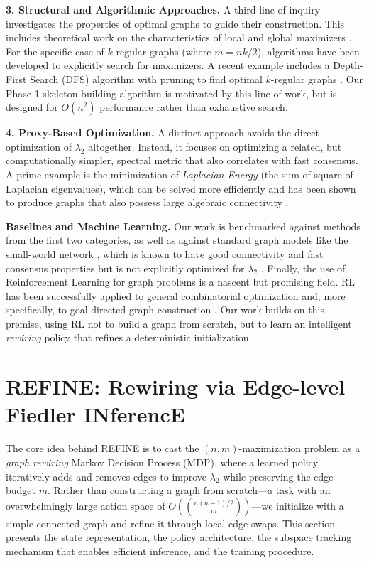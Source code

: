 \documentclass{article}
\begin{document}
\textbf{3. Structural and Algorithmic Approaches.} A third line of inquiry investigates the properties of optimal graphs to guide their construction. This includes theoretical work on the characteristics of local and global maximizers \cite{belk2023algebraic, 10004730}. For the specific case of $k$-regular graphs (where $m = nk/2$), algorithms have been developed to explicitly search for maximizers. A recent example includes a Depth-First Search (DFS) algorithm with pruning to find optimal $k$-regular graphs \cite{10818309}. Our Phase 1 skeleton-building algorithm is motivated by this line of work, but is designed for $O(n^2)$ performance rather than exhaustive search.

\textbf{4. Proxy-Based Optimization.} A distinct approach avoids the direct optimization of $\lambda_2$ altogether. Instead, it focuses on optimizing a related, but computationally simpler, spectral metric that also correlates with fast consensus. A prime example is the minimization of \textit{Laplacian Energy} (the sum of square of Laplacian eigenvalues), which can be solved more efficiently and has been shown to produce graphs that also possess large algebraic connectivity \cite{lu2024fast}.

\textbf{Baselines and Machine Learning.} Our work is benchmarked against methods from the first two categories, as well as against standard graph models like the small-world network \cite{watts1998collective}, which is known to have good connectivity and fast consensus properties but is not explicitly optimized for $\lambda_2$ \cite{1470321}. Finally, the use of Reinforcement Learning for graph problems is a nascent but promising field. RL has been successfully applied to general combinatorial optimization \cite{bello2016neural} and, more specifically, to goal-directed graph construction \cite{doi:10.1098/rspa.2021.0168}. Our work builds on this premise, using RL not to build a graph from scratch, but to learn an intelligent \emph{rewiring} policy that refines a deterministic initialization.




\section{REFINE: Rewiring via Edge-level Fiedler INferencE}

The core idea behind REFINE is to cast the $(n,m)$-maximization problem as a \emph{graph rewiring} Markov Decision Process (MDP), where a learned policy iteratively adds and removes edges to improve $\lambda_2$ while preserving the edge budget $m$. Rather than constructing a graph from scratch—a task with an overwhelmingly large action space of $O\!\left(\binom{n(n-1)/2}{m}\right)$—we initialize with a simple connected graph and refine it through local edge swaps. This section presents the state representation, the policy architecture, the subspace tracking mechanism that enables efficient inference, and the training procedure.
\end{document}
